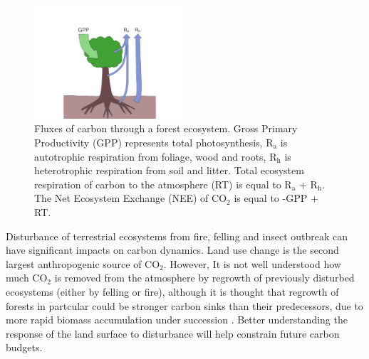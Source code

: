 \begin{figure}[ht]
    \centering
    \includegraphics[width=0.5\textwidth]{chapter/chapter1/flux.pdf}
    \caption{Fluxes of carbon through a forest ecosystem. Gross Primary Productivity (GPP) represents total photosynthesis, R\(_{\text{a}}\) is autotrophic respiration from foliage, wood and roots, R\(_{\text{h}}\) is heterotrophic respiration from soil and litter. Total ecosystem respiration of carbon to the atmosphere (RT) is equal to R\(_{\text{a}}\) + R\(_{\text{h}}\). The Net Ecosystem Exchange (NEE) of CO\(_{2}\) is equal to -GPP + RT.}
    \label{chap1:fig:eco_fluxes}
\end{figure}

Disturbance of terrestrial ecosystems from fire, felling and insect outbreak can have significant impacts on carbon dynamics. Land use change is the second largest anthropogenic source of CO\(_{2}\). However, It is not well understood how much CO\(_{2}\) is removed from the atmosphere by regrowth of previously disturbed ecosystems (either by felling or fire), although it is thought that regrowth of forests in partcular could be stronger carbon sinks than their predecessors, due to more rapid biomass accumulation under succession \citep{pan2011large}. Better understanding the response of the land surface to disturbance will help constrain future carbon budgets. 




